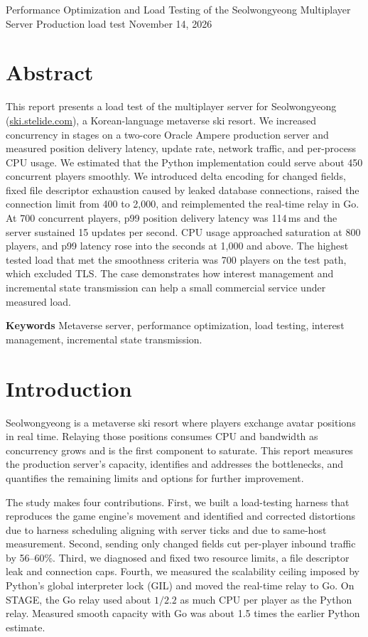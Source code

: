 \documentclass[11pt,a4paper]{article}
\begin{document}
  {Performance Optimization and Load Testing of the Seolwongyeong Multiplayer Server}
  {Production load test \enspace\textbar\enspace November 14, 2026}

\section*{Abstract}
This report presents a load test of the multiplayer server for Seolwongyeong
(\href{https://ski.stelide.com}{ski.stelide.com}), a Korean-language metaverse ski resort.
We increased concurrency in stages on a two-core Oracle Ampere production server and measured
position delivery latency, update rate, network traffic, and per-process CPU usage. We estimated
that the Python implementation could serve about 450 concurrent players smoothly. We introduced
delta encoding for changed fields, fixed file descriptor exhaustion caused by leaked database
connections, raised the connection limit from 400 to 2,000, and reimplemented the real-time relay
in Go. At 700 concurrent players, p99 position delivery latency was 114\,ms and the server sustained
15 updates per second. CPU usage approached saturation at 800 players, and p99 latency rose into the
seconds at 1,000 and above. The highest tested load that met the smoothness criteria was 700
players on the test path, which excluded TLS. The case demonstrates how interest management
and incremental state transmission can help a small commercial service under measured load.

{\small\textbf{Keywords} \quad Metaverse server, performance optimization, load testing,
interest management, incremental state transmission.}

\section{Introduction}
Seolwongyeong is a metaverse ski resort where players exchange avatar positions in real time.
Relaying those positions consumes CPU and bandwidth as concurrency grows and is the first component
to saturate. This report measures the production server's capacity, identifies and addresses the
bottlenecks, and quantifies the remaining limits and options for further improvement.

The study makes four contributions. First, we built a load-testing harness that reproduces the
game engine's movement and identified and corrected distortions due to harness scheduling aligning
with server ticks and due to same-host measurement. Second, sending only changed fields cut
per-player inbound traffic by 56--60\%. Third, we diagnosed and fixed two resource limits, a file
descriptor leak and connection caps. Fourth, we measured the scalability ceiling imposed by
Python's global interpreter lock (GIL) and moved the real-time relay to Go. On STAGE, the Go relay
used about \(1/2.2\) as much CPU per player as the Python relay. Measured smooth capacity with Go
was about 1.5 times the earlier Python estimate.
\end{document}
